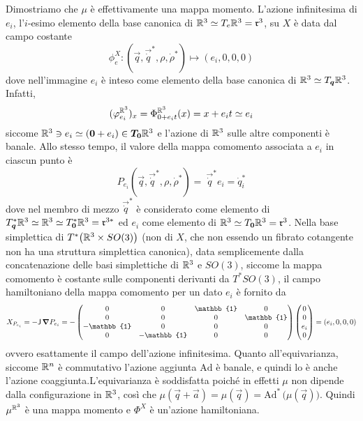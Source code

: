 Dimostriamo che $\mu$ è effettivamente una mappa momento. L'azione infinitesima di $e_i$, l'$i$-esimo elemento della base canonica di $\mathbb{R}^3 \simeq T_e \mathbb{R}^3 = \mathfrak{r}^3$, su $X$ è data dal campo costante
\begin{equation*}
\phi_{e}^X: (\vec{q},\vec{\dot{q}}^*, \rho, \dot{\rho}^*)\longmapsto (e_i, 0, 0, 0)
\end{equation*}
dove nell'immagine $e_i$ è inteso come elemento della base canonica di $\mathbb{R}^3 \simeq T_{\boldsymbol{q}}\mathbb{R}^3$. Infatti, \begin{equation*}
  (\varphi^{\mathbb{R}^3}_{e_i})_x = \Phi^{\mathbb{R}^3}_{0 + e_i t}(x) = x + e_i t \simeq e_i
\end{equation*}
siccome $\mathbb{R}^3 \ni e_i \simeq (\boldsymbol{0}+e_i) \in \boldsymbol{T_0} \mathbb{R}^3 $ e l'azione di $\mathbb{R}^3$ sulle altre componenti è banale. Allo stesso tempo, il valore della mappa comomento associata a $e_i$ in ciascun punto è 
\begin{equation*}
  P_{e_i}(\vec{q},\vec{\dot{q}}^*, \rho, \dot{\rho}^*) =\ \vec{\dot{q}}^*\! e_i = \dot{q}^*_i
\end{equation*} 
dove nel membro di mezzo $\vec{\dot{q}}^*$ è considerato come elemento di $T^*_{\boldsymbol{q}}\mathbb{R}^3 \simeq \mathbb{R}^3 \simeq T^*_{\boldsymbol{0}}\mathbb{R}^3 = \mathfrak{r}^{3*}$ ed $e_i$ come elemento di $\mathbb{R}^3 \simeq T_{\boldsymbol{0}}\mathbb{R}^3 = \mathfrak{r}^3$. Nella base simplettica di $T^*\big(\mathbb{R}^3 \times  SO(3)\big)$ (non di $X$, che non essendo un fibrato cotangente non ha una struttura simplettica canonica), data semplicemente dalla concatenazione delle basi simplettiche di $\mathbb{R}^3$ e $SO(3)$, siccome la mappa comomento è costante sulle componenti derivanti da $T^*SO(3)$, il campo hamiltoniano della mappa comomento per un dato $e_i$ è fornito da \begin{equation*}
X_{P_{e_i}} = - \mathsf{J}\, \grad{P_{e_i}} = - \begin{pmatrix}
  0 & 0 & \mathbb{1} & 0 \\
  0 & 0 & 0 & \mathbb{1} \\
  -\mathbb{1} & 0 & 0 & 0 \\ 
  0 & -\mathbb{1} & 0 & 0 
\end{pmatrix} \begin{pmatrix}
0 \\ 0 \\ e_i \\ 0
\end{pmatrix} = (e_i, 0, 0, 0)
\end{equation*} 
ovvero esattamente il campo dell'azione infinitesima. Quanto all'equivarianza, siccome $\mathbb{R}^{n}$ è commutativo l'azione aggiunta $\mathrm{Ad}$ è banale, e quindi lo è anche l'azione coaggiunta.L'equivarianza è soddisfatta poiché in effetti $\mu$ non dipende dalla configurazione in $\mathbb{R}^3$, così che $\mu(\vec{q}+\vec{a}) = \mu(\vec{q}) = \mathrm{Ad}^*\,\big(\mu(\vec{q})\big)$. Quindi $\mu^{\mathbb{R}^3}$ è una mappa momento e $\Phi^X$ è un'azione hamiltoniana.

